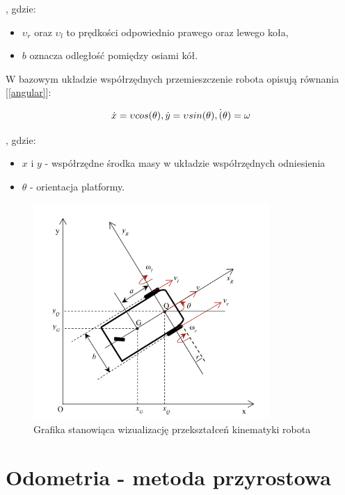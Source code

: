 , gdzie:
\begin{itemize}
    \item \(\upsilon_r\) oraz \(\upsilon_l\) to prędkości odpowiednio prawego oraz lewego koła,
    \item \(b\) oznacza odległość pomiędzy osiami kół.
\end{itemize}

W bazowym układzie współrzędnych przemieszczenie robota opisują równania [\ref{angular}]:

\begin{equation}
    \centering
    \dot{x} = \upsilon cos(\theta), \dot{y} = \upsilon sin(\theta), \dot(\theta) = \omega
    \label{eq:angular}
\end{equation}

, gdzie:
\begin{itemize}
    \item \(x\) i \(y\) - współrzędne środka masy w układzie współrzędnych odniesienia
    \item \(\theta\) - orientacja platformy.
\end{itemize}


\begin{figure}[H]
    \centering
    \includegraphics[width=0.8\textwidth]{./graf/diff-drive.png}
    \caption{Grafika stanowiąca wizualizację przekształceń kinematyki robota \cite{bib:konferencja}}
\end{figure}

\section{Odometria - metoda przyrostowa \cite{bib:rozprawa-odometria}}


